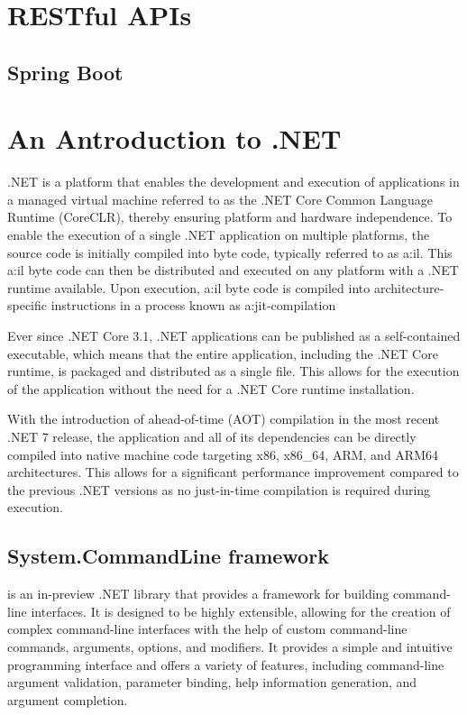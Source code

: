 \section{RESTful APIs}


\subsection{Spring Boot}


\section{An Antroduction to .NET}

.NET is a platform that enables the development and execution of applications in a managed virtual machine referred to as the .NET Core Common Language Runtime (CoreCLR), thereby ensuring platform and hardware independence. To enable the execution of a single .NET application on multiple platforms, the source code is initially compiled into byte code, typically referred to as \gls{a:il}. This \gls{a:il} byte code can then be distributed and executed on any platform with a .NET runtime available. Upon execution, \gls{a:il} byte code is compiled into architecture-specific instructions in a process known as \gls{a:jit}-compilation

Ever since .NET Core 3.1, .NET applications can be published as a self-contained executable, which means that the entire application, including the .NET Core runtime, is packaged and distributed as a single file. This allows for the execution of the application without the need for a .NET Core runtime installation.

With the introduction of ahead-of-time (AOT) compilation in the most recent .NET 7 release, the application and all of its dependencies can be directly compiled into native machine code targeting x86, x86_64, ARM, and ARM64 architectures. This allows for a significant performance improvement compared to the previous .NET versions as no just-in-time compilation is required during execution.

\subsection{System.CommandLine framework}

 is an in-preview .NET library that provides a framework for building command-line interfaces. It is designed to be highly extensible, allowing for the creation of complex command-line interfaces with the help of custom command-line commands, arguments, options, and modifiers. It provides a simple and intuitive programming interface and offers a variety of features, including command-line argument validation, parameter binding, help information generation, and argument completion.


